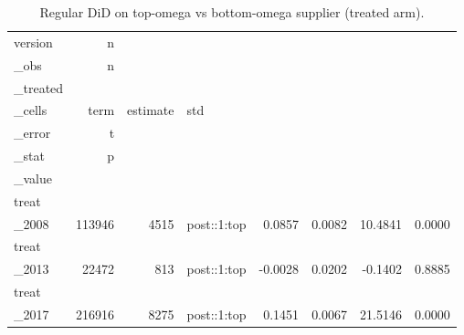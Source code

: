 \begin{table}[ht]
\centering
\caption{Regular DiD on top-omega vs bottom-omega supplier (treated arm).} 
\begin{tabular}{lrrlrrrr}
  \toprule
version & n\\_obs & n\\_treated\\_cells & term & estimate & std\\_error & t\\_stat & p\\_value \\ 
  \midrule
treat\\_2008 & 113946 &  4515 & post::1:top & 0.0857 & 0.0082 & 10.4841 & 0.0000 \\ 
  treat\\_2013 & 22472 &   813 & post::1:top & -0.0028 & 0.0202 & -0.1402 & 0.8885 \\ 
  treat\\_2017 & 216916 &  8275 & post::1:top & 0.1451 & 0.0067 & 21.5146 & 0.0000 \\ 
   \bottomrule
\end{tabular}
\end{table}
